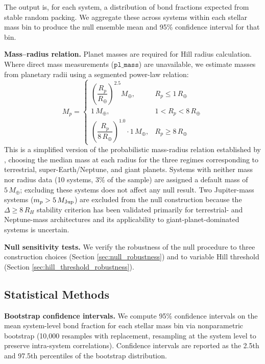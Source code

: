 \documentclass[twocolumn,usenatbib]{mnras}
\begin{document}
The output is, for each system, a distribution of bond fractions expected from
stable random packing. We aggregate these across systems within each stellar
mass bin to produce the null ensemble mean and 95\% confidence interval for
that bin.

\textbf{Mass--radius relation.} Planet masses are required for Hill radius
calculation. Where direct mass measurements ($\texttt{pl\_mass}$) are
unavailable, we estimate masses from planetary radii using a segmented
power-law relation:
\begin{equation}
M_p = \begin{cases}
       \left( \dfrac{R_p}{R_\oplus} \right)^{2.5} M_\oplus,
       & R_p \leq 1\,R_\oplus \\[6pt]
       1\,M_\oplus,
       & 1 < R_p < 8\,R_\oplus \\[6pt]
       \left( \dfrac{R_p}{8\,R_\oplus} \right)^{1.0} \cdot 1\,M_\oplus,
       & R_p \geq 8\,R_\oplus
      \end{cases}
\label{eq:mr}
\end{equation}
This is a simplified version of the probabilistic mass-radius relation
established by \citet{weiss2018}, choosing the median mass at each radius
for the three regimes corresponding to terrestrial, super-Earth/Neptune, and
giant planets. Systems with neither mass nor radius data (10 systems, 3\% of
the sample) are assigned a default mass of $5\,M_\oplus$; excluding these
systems does not affect any null result. Two Jupiter-mass systems ($m_p >
5\,M_{\rm Jup}$) are excluded from the null construction because the
$\Delta \geq 8\,R_H$ stability criterion has been validated primarily for
terrestrial- and Neptune-mass architectures and its applicability to
giant-planet-dominated systems is uncertain\citep{puwu2015}.

\textbf{Null sensitivity tests.} We verify the robustness of the null
procedure to three construction choices (Section \ref{sec:null_robustness})
and to variable Hill threshold (Section \ref{sec:hill_threshold_robustness}).

\subsection{Statistical Methods}
\label{sec:statistical}

\textbf{Bootstrap confidence intervals.} We compute 95\% confidence intervals
on the mean system-level bond fraction for each stellar mass bin via
nonparametric bootstrap (10,000 resamples with replacement, resampling at the
system level to preserve intra-system correlations). Confidence intervals are
reported as the 2.5th and 97.5th percentiles of the bootstrap distribution.
\end{document}
